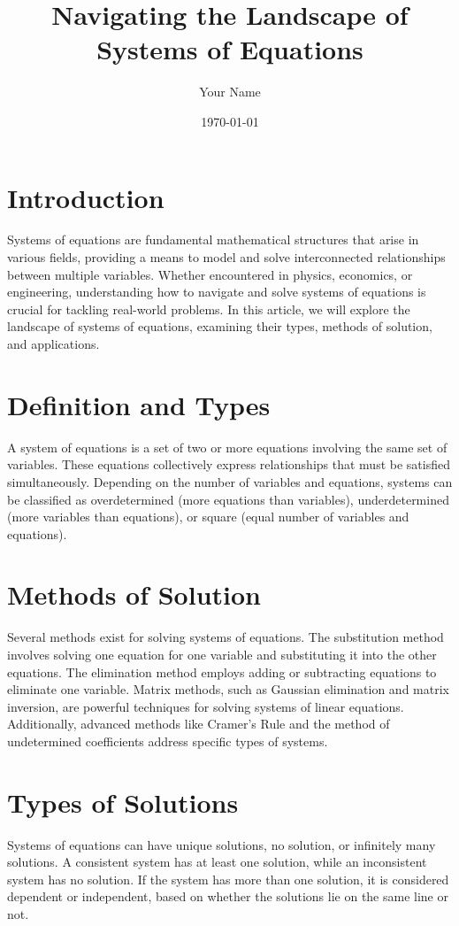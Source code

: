 \documentclass{article}
\title{Navigating the Landscape of Systems of Equations}
\author{Your Name}
\date{\today}
\begin{document}
\maketitle

\section*{Introduction}
Systems of equations are fundamental mathematical structures that arise in various fields, providing a means to model and solve interconnected relationships between multiple variables. Whether encountered in physics, economics, or engineering, understanding how to navigate and solve systems of equations is crucial for tackling real-world problems. In this article, we will explore the landscape of systems of equations, examining their types, methods of solution, and applications.

\section*{Definition and Types}
A system of equations is a set of two or more equations involving the same set of variables. These equations collectively express relationships that must be satisfied simultaneously. Depending on the number of variables and equations, systems can be classified as overdetermined (more equations than variables), underdetermined (more variables than equations), or square (equal number of variables and equations).

\section*{Methods of Solution}
Several methods exist for solving systems of equations. The substitution method involves solving one equation for one variable and substituting it into the other equations. The elimination method employs adding or subtracting equations to eliminate one variable. Matrix methods, such as Gaussian elimination and matrix inversion, are powerful techniques for solving systems of linear equations. Additionally, advanced methods like Cramer's Rule and the method of undetermined coefficients address specific types of systems.

\section*{Types of Solutions}
Systems of equations can have unique solutions, no solution, or infinitely many solutions. A consistent system has at least one solution, while an inconsistent system has no solution. If the system has more than one solution, it is considered dependent or independent, based on whether the solutions lie on the same line or not.
\end{document}
